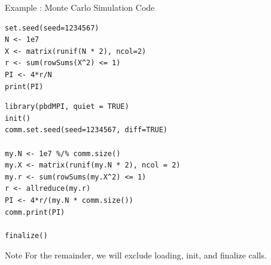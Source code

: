 \begin{frame}[fragile]
  \begin{exampleblock}{Example \showex :  Monte Carlo Simulation Code}\pause
\begin{lstlisting}[title=Serial Code]
set.seed(seed=1234567)
N <- 1e7
X <- matrix(runif(N * 2), ncol=2)
r <- sum(rowSums(X^2) <= 1)
PI <- 4*r/N
print(PI)
\end{lstlisting}

\begin{lstlisting}[title=Parallel Code]
library(pbdMPI, quiet = TRUE)
init()
comm.set.seed(seed=1234567, diff=TRUE)

my.N <- 1e7 %/% comm.size()
my.X <- matrix(runif(my.N * 2), ncol = 2)
my.r <- sum(rowSums(my.X^2) <= 1)
r <- allreduce(my.r)
PI <- 4*r/(my.N * comm.size())
comm.print(PI)

finalize()
\end{lstlisting}
  \end{exampleblock}
\end{frame}

\begin{frame}[fragile]
  \begin{block}{Note}\pause
    For the remainder, we will exclude loading, init, and finalize calls.
  \end{block}
\end{frame}



